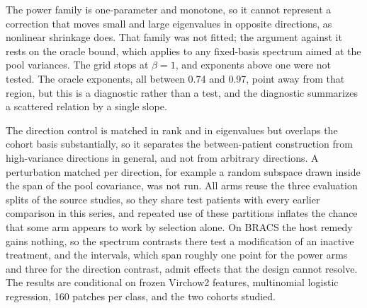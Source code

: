 The power family is one-parameter and monotone, so it cannot represent a correction that moves small and large eigenvalues in opposite directions, as nonlinear shrinkage does. That family was not fitted; the argument against it rests on the oracle bound, which applies to any fixed-basis spectrum aimed at the pool variances. The grid stops at $\beta=1$, and exponents above one were not tested. The oracle exponents, all between 0.74 and 0.97, point away from that region, but this is a diagnostic rather than a test, and the diagnostic summarizes a scattered relation by a single slope.

The direction control is matched in rank and in eigenvalues but overlaps the cohort basis substantially, so it separates the between-patient construction from high-variance directions in general, and not from arbitrary directions. A perturbation matched per direction, for example a random subspace drawn inside the span of the pool covariance, was not run. All arms reuse the three evaluation splits of the source studies, so they share test patients with every earlier comparison in this series, and repeated use of these partitions inflates the chance that some arm appears to work by selection alone. On BRACS the host remedy gains nothing, so the spectrum contrasts there test a modification of an inactive treatment, and the intervals, which span roughly one point for the power arms and three for the direction contrast, admit effects that the design cannot resolve. The results are conditional on frozen Virchow2 features, multinomial logistic regression, 160 patches per class, and the two cohorts studied.
